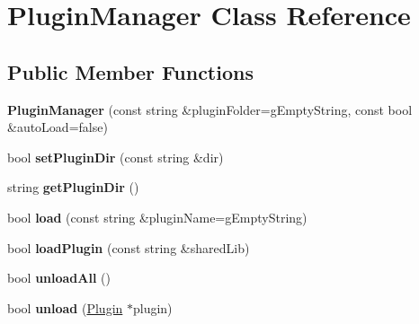 \hypertarget{classrrp_1_1_plugin_manager}{\section{Plugin\-Manager Class Reference}
\label{classrrp_1_1_plugin_manager}
}
\subsection*{Public Member Functions}
\begin{DoxyCompactItemize}
\item 
\hypertarget{classrrp_1_1_plugin_manager_af8dcd284cd267e82c1a151a9cc5121a7}{{\bfseries Plugin\-Manager} (const string \&plugin\-Folder=g\-Empty\-String, const bool \&auto\-Load=false)}\label{classrrp_1_1_plugin_manager_af8dcd284cd267e82c1a151a9cc5121a7}

\item 
\hypertarget{classrrp_1_1_plugin_manager_acb4f2b26754558cec075874c731da265}{bool {\bfseries set\-Plugin\-Dir} (const string \&dir)}\label{classrrp_1_1_plugin_manager_acb4f2b26754558cec075874c731da265}

\item 
\hypertarget{classrrp_1_1_plugin_manager_ab00d16101fa654bd23bbe8f8460395fb}{string {\bfseries get\-Plugin\-Dir} ()}\label{classrrp_1_1_plugin_manager_ab00d16101fa654bd23bbe8f8460395fb}

\item 
\hypertarget{classrrp_1_1_plugin_manager_a5e927200c0f576f8714a6545ecc3701e}{bool {\bfseries load} (const string \&plugin\-Name=g\-Empty\-String)}\label{classrrp_1_1_plugin_manager_a5e927200c0f576f8714a6545ecc3701e}

\item 
\hypertarget{classrrp_1_1_plugin_manager_a246074aa978176f0246c25fe7c2b2251}{bool {\bfseries load\-Plugin} (const string \&shared\-Lib)}\label{classrrp_1_1_plugin_manager_a246074aa978176f0246c25fe7c2b2251}

\item 
\hypertarget{classrrp_1_1_plugin_manager_ab4aa0b099cfb4506650dad99b4968502}{bool {\bfseries unload\-All} ()}\label{classrrp_1_1_plugin_manager_ab4aa0b099cfb4506650dad99b4968502}

\item 
\hypertarget{classrrp_1_1_plugin_manager_a19f34ef3cd08a5cb50238b4e6add2701}{bool {\bfseries unload} (\hyperlink{classrrp_1_1_plugin}{Plugin} $\ast$plugin)}\label{classrrp_1_1_plugin_manager_a19f34ef3cd08a5cb50238b4e6add2701}


\end{DoxyCompactItemize}
